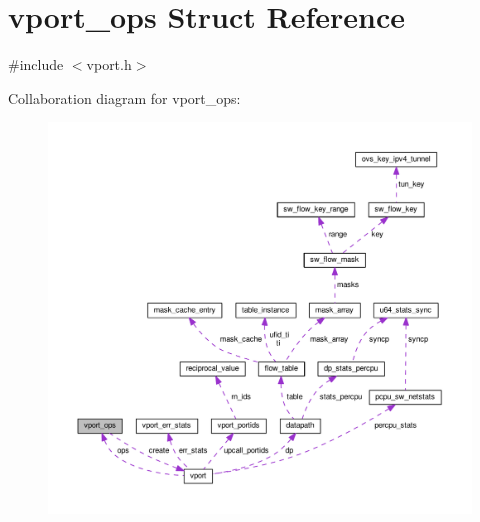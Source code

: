 \hypertarget{structvport__ops}{}\section{vport\+\_\+ops Struct Reference}
\label{structvport__ops}


{\ttfamily \#include $<$vport.\+h$>$}



Collaboration diagram for vport\+\_\+ops\+:
\nopagebreak
\begin{figure}[H]
\begin{center}
\leavevmode
\includegraphics[width=350pt]{structvport__ops__coll__graph}
\end{center}
\end{figure}
